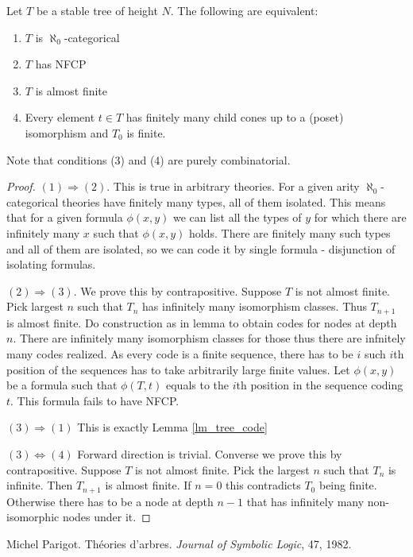 \documentclass{amsart}
\begin{document}
\begin{Theorem} \label{th_tree_nfcp}
	Let $T$ be a stable tree of height $N$. The following are equivalent:
	\begin{enumerate}
		\item $T$ is $\aleph_0$-categorical
		\item $T$ has NFCP
		\item $T$ is almost finite
		\item Every element $t \in T$ has finitely many child cones up to a (poset) isomorphism and $T_0$ is finite.
	\end{enumerate}
\end{Theorem}

Note that conditions (3) and (4) are purely combinatorial.

\begin{proof}
	$(1) \Rightarrow (2)$. This is true in arbitrary theories. For a given arity $\aleph_0$-categorical theories have finitely many types, all of them isolated. This means that for a given formula $\phi(x, y)$ we can list all the types of $y$ for which there are infinitely many $x$ such that $\phi(x, y)$ holds. There are finitely many such types and all of them are isolated, so we can code it by single formula - disjunction of isolating formulas.
	
	$(2) \Rightarrow (3)$. We prove this by contrapositive. Suppose $T$ is not almost finite. Pick largest $n$ such that $T_n$ has infinitely many isomorphism classes. Thus $T_{n+1}$ is almost finite. Do construction as in lemma to obtain codes for nodes at depth $n$. There are infinitely many isomorphism classes for those thus there are infnitely many codes realized. As every code is a finite sequence, there has to be $i$ such $i$th position of the sequences has to take arbitrarily large finite values. Let $\phi(x,y)$ be a formula such that $\phi(T, t)$ equals to the $i$th position in the sequence coding $t$. This formula fails to have NFCP.
	
	$(3) \Rightarrow (1)$ This is exactly Lemma \ref{lm_tree_code} %
	
	$(3) \Leftrightarrow (4)$ Forward direction is trivial. Converse we prove this by contrapositive. Suppose $T$ is not almost finite. Pick the largest $n$ such that $T_n$ is infinite. Then $T_{n+1}$ is almost finite. If $n=0$ this contradicts $T_0$ being finite. Otherwise there has to be a node at depth $n-1$ that has infinitely many non-isomorphic nodes under it. 
\end{proof}

\begin{thebibliography}{9}

	Michel Parigot.
	Th\'eories d'arbres.
	\textit{Journal of Symbolic Logic}, 47, 1982.
	
\end{thebibliography}
\end{document}
